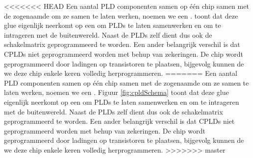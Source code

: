 <<<<<<< HEAD
Een aantal PLD componenten samen op \'e\'en chip samen met de zogenaamde  om ze samen te laten werken, noemen we een .  toont dat deze glue eigenlijk neerkomt op een  om PLDs te laten samenwerken en  om te intrageren met de buitenwereld. Naast de PLDs zelf dient dus ook de schakelmatrix geprogrammeerd te worden. Een ander belangrijk verschil is dat CPLDs niet geprogrammeerd worden met behup van zekeringen. De chip wordt geprogrammeerd door ladingen op transistoren te plaatsen, bijgevolg kunnen de we deze chip enkele keren volledig herprogrammeren.
=======
Een aantal PLD componenten samen op \'e\'en chip samen met de zogenaamde  om ze samen te laten werken, noemen we een . Figuur \ref{fig:cpldSchema} toont dat deze glue eigenlijk neerkomt op een  om PLDs te laten samenwerken en  om te intrageren met de buitenwereld. Naast de PLDs zelf dient dus ook de schakelmatrix geprogrammeerd te worden. Een ander belangrijk verschil is dat CPLDs niet geprogrammeerd worden met behup van zekeringen. De chip wordt geprogrammeerd door ladingen op transistoren te plaatsen, bijgevolg kunnen de we deze chip enkele keren volledig herprogrammeren.
>>>>>>> master
